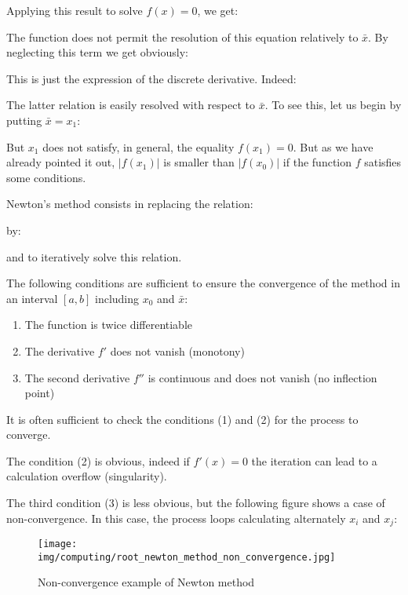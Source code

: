 	Applying this result to solve $f(x)=0$, we get:
	
	The function does not permit the resolution of this equation relatively to $\bar{x}$. By neglecting this term we get obviously:
	
	This is just the expression of the discrete derivative. Indeed:
	 
	The latter relation is easily resolved with respect to $\bar{x}$. To see this, let us begin by putting $\bar{x}=x_1$:
	
	But $x_1$ does not satisfy, in general, the equality $f(x_1)=0$. But as we have already pointed it out, $|f(x_1)|$  is smaller than $|f(x_0)|$ if the function $f$ satisfies some conditions.
	
	Newton's method consists in replacing the relation:
	
	by:
	
	and to iteratively solve this relation.
	
	The following conditions are sufficient to ensure the convergence of the method in an interval $[a, b]$ including $x_0$ and $\bar{x}$:
	\begin{enumerate}
		\item The function is twice differentiable

		\item The derivative $f'$ does not vanish (monotony)
		\item The second derivative $f''$ is continuous and does not vanish (no inflection point)
	\end{enumerate}
	\begin{tcolorbox}[title=Remark,colframe=black,arc=10pt]
	It is often sufficient to check the conditions (1) and (2) for the process to converge.
	\end{tcolorbox}
	The condition (2) is obvious, indeed if $f'(x)=0$ the iteration can lead to a calculation overflow (singularity).
	
	The third condition (3) is less obvious, but the following figure shows a case of non-convergence. In this case, the process loops calculating alternately $x_i$ and $x_j$:
	\begin{figure}[H]
		\centering
		\texttt{[image: img/computing/root\_newton\_method\_non\_convergence.jpg]}
		\caption{Non-convergence example of Newton method}
	\end{figure}
	

